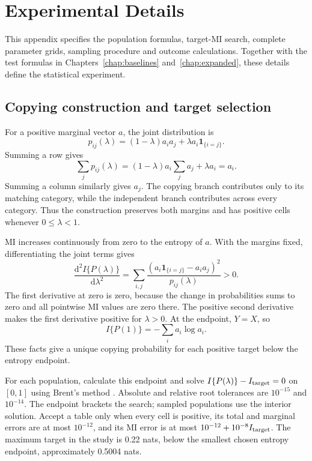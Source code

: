 \chapter{Experimental Details}
\label{app:construction}

This appendix specifies the population formulas, target-MI search, complete
parameter grids, sampling procedure and outcome calculations. Together with
the test formulas in Chapters~\ref{chap:baselines} and~\ref{chap:expanded},
these details define the statistical experiment.

\section{Copying construction and target selection}

For a positive marginal vector \(a\), the joint distribution is
\begin{equation}
 p_{ij}(\lambda)=(1-\lambda)a_i a_j+\lambda a_i\mathbf{1}_{\{i=j\}}.
\end{equation}
Summing a row gives
\begin{equation}
 \sum_jp_{ij}(\lambda)
 =(1-\lambda)a_i\sum_ja_j+\lambda a_i=a_i.
\end{equation}
Summing a column similarly gives \(a_j\). The copying branch contributes
only to its matching category, while the independent branch contributes
across every category. Thus the construction preserves both margins and
has positive cells whenever \(0\leq\lambda<1\).

MI increases continuously from zero to the entropy of \(a\).
With the margins fixed, differentiating the joint terms gives
\begin{equation}
 \frac{\mathrm d^2 I\{P(\lambda)\}}{\mathrm d\lambda^2}
 =\sum_{i,j}\frac{(a_i\mathbf{1}_{\{i=j\}}-a_i a_j)^2}
                     {p_{ij}(\lambda)}>0.
\end{equation}
The first derivative at zero is zero, because the change in probabilities
sums to zero and all pointwise MI values are zero there. The positive
second derivative makes the first derivative positive for
\(\lambda>0\). At the endpoint, \(Y=X\), so
\begin{equation}
 I\{P(1)\}=-\sum_i a_i\log a_i.
\end{equation}
These facts give a unique copying probability for each positive target
below the entropy endpoint.

For each population, calculate this endpoint and solve
\(I\{P(\lambda)\}-I_{\rm target}=0\) on \([0,1]\) using Brent's
method \citep{brent1973}. Absolute and relative root tolerances are
\(10^{-15}\) and \(10^{-14}\). The endpoint brackets the search;
sampled populations use the interior solution. Accept a table only when
every cell is positive, its total and marginal errors are at most
\(10^{-12}\), and its MI error is at most
\(10^{-12}+10^{-8}I_{\rm target}\). The maximum target in the study is
0.22 nats, below the smallest chosen entropy endpoint, approximately
0.5004 nats.

